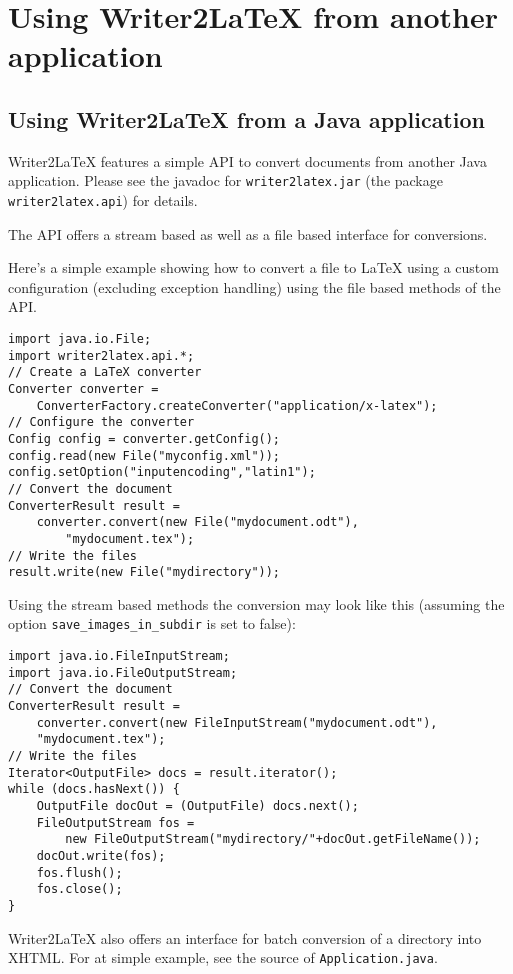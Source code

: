 \documentclass{article}
\newcommand\textstyleSourceText[1]{\texttt{\textmd{#1}}}
\begin{document}
\section{Using Writer2LaTeX from another application}
\subsection{Using Writer2LaTeX from a Java application}
{\mdseries
Writer2LaTeX features a simple API to convert documents from another Java application. Please see the javadoc for \textstyleSourceText{writer2latex.jar} (the package \textstyleSourceText{writer2latex.api}) for details.}

{\mdseries
The API offers a stream based as well as a file based interface for conversions.}

{\mdseries
Here's a simple example showing how to convert a file to LaTeX using a custom configuration (excluding exception handling) using the file based methods of the API.}

\begin{verbatim}
import java.io.File;
import writer2latex.api.*;
// Create a LaTeX converter
Converter converter =
    ConverterFactory.createConverter("application/x-latex");
// Configure the converter
Config config = converter.getConfig();
config.read(new File("myconfig.xml"));
config.setOption("inputencoding","latin1");
// Convert the document
ConverterResult result =
    converter.convert(new File("mydocument.odt"),
        "mydocument.tex");
// Write the files
result.write(new File("mydirectory"));
\end{verbatim}
{\mdseries
Using the stream based methods the conversion may look like this (assuming the option \textstyleSourceText{save\_images\_in\_subdir} is set to false):}

\begin{verbatim}
import java.io.FileInputStream;
import java.io.FileOutputStream;
// Convert the document
ConverterResult result =
    converter.convert(new FileInputStream("mydocument.odt"),   
    "mydocument.tex");
// Write the files
Iterator<OutputFile> docs = result.iterator();
while (docs.hasNext()) {
    OutputFile docOut = (OutputFile) docs.next();
    FileOutputStream fos = 
        new FileOutputStream("mydirectory/"+docOut.getFileName());
    docOut.write(fos);
    fos.flush();
    fos.close();
}
\end{verbatim}
{\mdseries
Writer2LaTeX also offers an interface for batch conversion of a directory into XHTML. For at simple example, see the source of \textstyleSourceText{Application.java}.}
\end{document}
